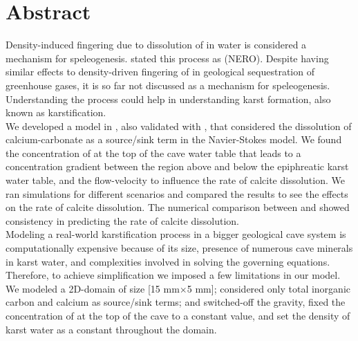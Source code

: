 \chapter*{Abstract}
\thispagestyle{empty}
Density-induced fingering due to dissolution of  in water is considered a mechanism for 
speleogenesis. \citet{Scherzer2017} stated this process as  (NERO). 
Despite having similar effects to density-driven fingering of  in geological sequestration 
of greenhouse gases, it is so far not discussed as a mechanism for speleogenesis. Understanding the 
process could help in understanding karst formation, also known as karstification.\\

We developed a model in \DuMuX, also validated with \MATLAB, that considered the dissolution of calcium-carbonate 
as a source/sink term in the Navier-Stokes model. We found the concentration of  at the top of 
the cave water table that leads to a concentration gradient between the region above and below the epiphreatic karst water table, 
and the flow-velocity to influence the rate of calcite dissolution. We ran simulations for different 
scenarios and compared the results to see the effects on the rate of calcite dissolution. The numerical comparison 
between \DuMuX and \MATLAB showed consistency in predicting the rate of calcite dissolution. \\

Modeling a real-world karstification process in a bigger geological cave system is computationally expensive 
because of its size, presence of numerous cave minerals in karst water, and complexities involved in 
solving the governing equations. Therefore, to achieve simplification we imposed a few limitations in our model. 
We modeled a 2D-domain of size [15 mm$\times$5 mm]; considered only total inorganic carbon and calcium as source/sink terms; and 
switched-off the gravity, fixed the concentration of  at the top of the cave to a constant value, and 
set the density of karst water as a constant throughout the domain. \\

\endinput
